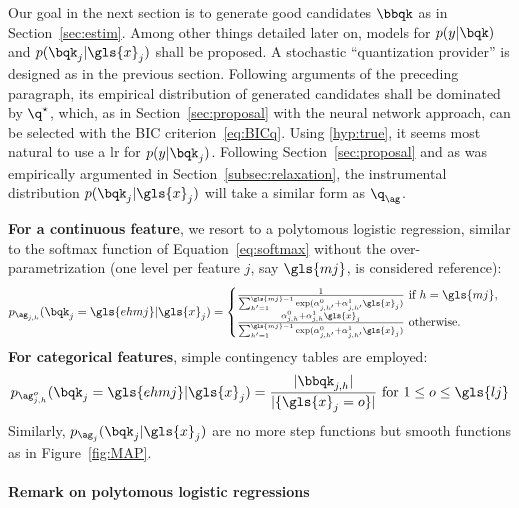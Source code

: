 Our goal in the next section is to generate good candidates $\bbqk$ as in Section~\ref{sec:estim}. Among other things detailed later on, models for $p(y | \bqk)$ and $p(\bqk_j | \gls{x}_j)$ shall be proposed. 
A stochastic ``quantization provider'' is designed as in the previous section. Following arguments of the preceding paragraph, its empirical distribution of generated candidates shall be dominated by $\q^\star$,
which, as in Section~\ref{sec:proposal} with the neural network approach, can be selected with the BIC criterion~\eqref{eq:BICq}. Using \eqref{hyp:true}, it seems most natural to use a \gls{lr} for $p( y | \bqk_j)$. Following Section~\ref{sec:proposal} and as was empirically argumented in Section~\ref{subsec:relaxation}, the instrumental distribution $p(\bqk_j | \gls{x}_j)$ will take a similar form as $\q_{\ag}$. 

{\bf For a continuous feature}, we resort to a polytomous logistic regression, similar to the softmax function of Equation~\eqref{eq:softmax} without the over-parametrization (one level per feature $j$, say $\gls{mj}$, is considered reference):
\[ p_{\ag_{j,h}}(\bqk_j = \gls{ehmj} | \gls{x}_j) = \begin{cases} \frac{1}{\sum_{h'=1}^{\gls{mj}-1} \exp(\alpha_{j,h'}^0 + \alpha_{j,h'}^1 \gls{x}_j)} \text{ if } h = \gls{mj}, \\ \frac{\alpha_{j,h}^0 + \alpha_{j,h}^1 \gls{x}_j}{\sum_{h'=1}^{\gls{mj}-1} \exp(\alpha_{j,h'}^0 + \alpha_{j,h'}^1 \gls{x}_j)} \text{ otherwise.} \end{cases} \]
{\bf For categorical features}, simple contingency tables are employed:
\[ p_{\ag_{j,h}^o}(\bqk_j = \gls{ehmj} | \gls{x}_j) = \frac{|\bbqk_{j,h}|}{|\{\gls{x}_j=o\}|} \text{ for } 1 \leq o \leq \gls{lj} \]
Similarly, $p_{\ag_j}(\bqk_j | \gls{x}_j)$ are no more step functions but smooth functions as in Figure~\ref{fig:MAP}.

\paragraph{Remark on polytomous logistic regressions}

